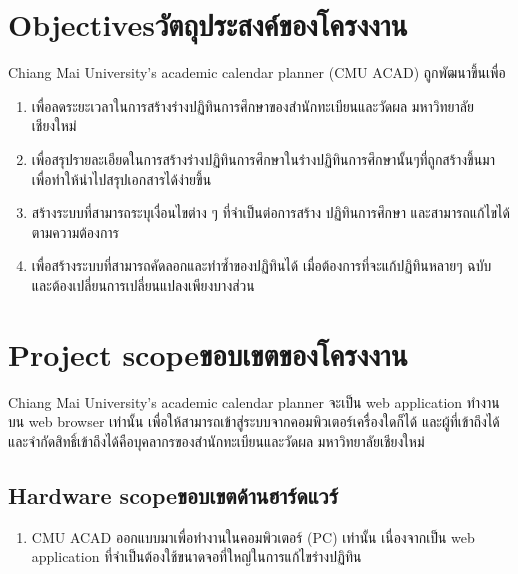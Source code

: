 


\section{\ifenglish Objectives\else วัตถุประสงค์ของโครงงาน\fi}
Chiang Mai University's academic calendar planner (CMU ACAD)  ถูกพัฒนาขึ้นเพื่อ
\begin{enumerate}
    \item เพื่อลดระยะเวลาในการสร้างร่างปฏิทินการศึกษาของสำนักทะเบียนและวัดผล มหาวิทยาลัยเชียงใหม่
    \item เพื่อสรุปรายละเอียดในการสร้างร่างปฏิทินการศึกษาในร่างปฏิทินการศึกษานั้นๆที่ถูกสร้างขึ้นมาเพื่อทำให้นำไปสรุปเอกสารได้ง่ายขึ้น
    \item สร้างระบบที่สามารถระบุเงื่อนไขต่าง ๆ ที่จําเป็นต่อการสร้าง ปฏิทินการศึกษา และสามารถแก้ไขได้ตามความต้องการ
    \item เพื่อสร้างระบบที่สามารถคัดลอกและทำซ้ำของปฏิทินได้ เมื่อต้องการที่จะแก้ปฏิทินหลายๆ ฉบับ และต้องเปลี่ยนการเปลี่ยนแปลงเพียงบางส่วน
\end{enumerate}

\section{\ifenglish Project scope\else ขอบเขตของโครงงาน\fi}
Chiang Mai University's academic calendar planner จะเป็น web application ทำงานบน web browser เท่านั้น เพื่อให้สามารถเข้าสู่ระบบจากคอมพิวเตอร์เครื่องใดก็ได้ และผู้ที่เข้าถึงได้และจำกัดสิทธิ์เข้าถึงได้คือบุคลากรของสำนักทะเบียนและวัดผล มหาวิทยาลัยเชียงใหม่
\subsection{\ifenglish Hardware scope\else ขอบเขตด้านฮาร์ดแวร์\fi}
\begin{enumerate}
    \item CMU ACAD ออกแบบมาเพื่อทำงานในคอมพิวเตอร์ (PC) เท่านั้น เนื่องจากเป็น web application ที่จำเป็นต้องใช้ขนาดจอที่ใหญ่ในการแก้ไขร่างปฏิทิน
\end{enumerate}

